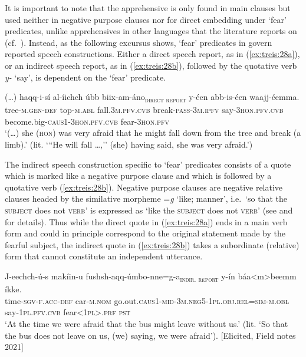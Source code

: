 \documentclass[output=paper,colorlinks,citecolor=brown,]{langscibook}
\begin{document}
It is important to note that the  apprehensive is only found in main clauses but used neither in negative purpose clauses nor for direct embedding under `fear' predicates, unlike apprehensives in other languages that the literature reports on (cf.\  \citealt{lichtenberk1995}). Instead, as the following excursus shows, `fear' predicates in  govern reported speech constructions. Either a direct speech report, as in (\ref{ex:treis:28a}), or an indirect speech report, as in (\ref{ex:treis:28b}), followed by the quotative verb \textit{y-} `say', is dependent on the `fear' predicate. 

\ea\label{ex:treis:28a} 
\gll \textnormal{(\ldots)} {\ob}haqq-i-sí al-íichch úbb biix-am-áno{\cb}\textsubscript{\textnormal{\textsc{direct report}}} y-éen abb-is-éen waajj-éemma. \\
{} \hphantom{[}tree-\textsc{m.gen-def} top-\textsc{m.abl} fall.\textsc{3m.pfv.cvb} break-\textsc{pass-3m.ipfv} say-\textsc{3hon.pfv.cvb} become.big-\textsc{caus1-3hon.pfv.cvb} fear-\textsc{3hon.pfv}\\
\glt `(\ldots) she (\textsc{hon}) was very afraid that he might fall down from the tree and break (a limb).' (lit. `{``}He will fall \ldots,'' (she) having said, she was very afraid.')  \citep[4.45]{KEB1989}
\z

The indirect speech construction specific to `fear' predicates consists of a quote which is marked like a negative purpose clause and which is followed by a quotative verb (\ref{ex:treis:28b}). Negative purpose clauses are negative relative clauses headed by the similative morpheme =\textit{g} `like; manner',  i.e.\ `so that the \textsc{subject} does not \textsc{verb}' is expressed as `like the \textsc{subject} does not \textsc{verb}' (see \citealt{Treis2010} and \citeyear{Treis2017} for details). Thus while the direct quote in (\ref{ex:treis:28a}) ends in a main verb form and could in principle correspond to the original statement made by the fearful subject, the indirect quote in (\ref{ex:treis:28b}) takes a subordinate (relative) form that cannot constitute an independent utterance.

\ea\label{ex:treis:28b} 
\gll J-eechch-ú-s {\ob}makíin-u fushsh-aqq-úmbo-nne=g-a{\cb}\textsubscript{\textnormal{\textsc{indir. report}}} y-ín báa<m>beemm íkke. \\
time-\textsc{sgv-f.acc-def} \hphantom{[}car-\textsc{m.nom} go.out.\textsc{caus1-mid-3m.neg5-1pl.obj.rel=sim-m.obl} say-\textsc{1pl.pfv.cvb} fear\textsc{<1pl>.prf} \textsc{pst}\\
\glt `At the time we were afraid that the bus might leave without us.' (lit. `So that the bus does not leave on us, (we) saying, we were afraid'). [Elicited, Field notes 2021]
\z 
\end{document}
